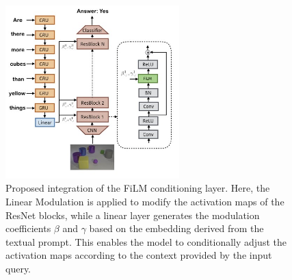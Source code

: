 \begin{figure}[t]
    \centering
    \includegraphics[width=0.6\textwidth]{figures/images/ch2/film_architecture.jpg}
    \caption{Proposed integration of the FiLM conditioning layer. Here, the Linear Modulation is applied to modify the activation maps of the ResNet blocks, while a linear layer generates the modulation coefficients $\beta$ and $\gamma$ based on the embedding derived from the textual prompt. This enables the model to conditionally adjust the activation maps according to the context provided by the input query.}
    \label{fig:film_architecture}
\end{figure}
